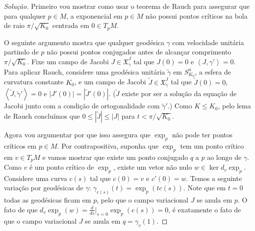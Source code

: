 \begin{proof}[Solução]\leavevmode
Primeiro vou mostrar como usar o teorema de Rauch para assegurar que para qualquer \(p \in M\), a exponencial em \(p \in M\) não possui pontos críticos na bola de raio \(\pi/\sqrt{K_0}\) centrada em \(0 \in T_pM\).

O seguinte argumento mostra que qualquer geodésica \(\gamma\) com velocidade unitária partindo de \(p\) não possui pontos conjugados antes de alcançar comprimento \(\pi/\sqrt{K_0}\). Fixe um campo de Jacobi \(J \in \mathfrak{X}_\gamma^J\) tal que \(J(0)=0\) e \(\left<J,\gamma'\right>=0\). Para aplicar Rauch, considere uma geodésica unitária \(\tilde{\gamma}\) em \(S^n_{K_0}\), a esfera de curvatura constante \(K_0\), e um campo de Jacobi  \(\tilde{J}\in\mathfrak{X}_{\tilde{\gamma}}^J\) tal que \(\tilde{J}(0)=0\), \(\left<\tilde{J},\tilde{\gamma}'\right>=0\) e \(|J'(0)|=|\tilde{J}'(0)|\). (\(\tilde{J}\) existe por ser a solução da equação de Jacobi junto com a condição de ortogonalidade com \(\tilde{\gamma}'\).) Como \(K \leq K_0\), pelo lema de Rauch concluímos que \(0 \leq  |\tilde{J}|\leq |J|\) para \(t <\pi/\sqrt{K_0}\).

	Agora vou argumentar por que isso assegura que \(\operatorname{exp}_p\) não pode ter pontos críticos em \(p \in M\). Por contrapositiva, suponha que \(\operatorname{exp}_p\) tem um ponto crítico em \(v \in T_pM\) e vamos mostrar que existe um ponto conjugado  \(q\) a \(p\) ao longo de \(\gamma\). Como \(v\) é um ponto crítico de \(\operatorname{exp}_p\), existe um vetor não nulo \(w \in \ker d_v \operatorname{exp}_p\). Considere uma curva \(c(s)\) tal que \(c(0)=v\) e \(c'(0)=w\). Temos a seguinte variação por geodésicas de \(\gamma\): \(\gamma_{c(s)}(t)=\operatorname{exp}_{p}(tc(s))\). Note que em \(t=0\) todas as geodésicas ficam em \(p\), pelo que o campo variacional \(J\) se anula em \(p\). O fato de que \(d_v \operatorname{exp}_p(w)=\frac{d}{ds}\Big|_{s=0}\operatorname{exp}_p(c(s))=0\), é exatamente o fato de que o campo variacional \(J\) se anula em \(q=\gamma_v(1)\).


\end{proof}
